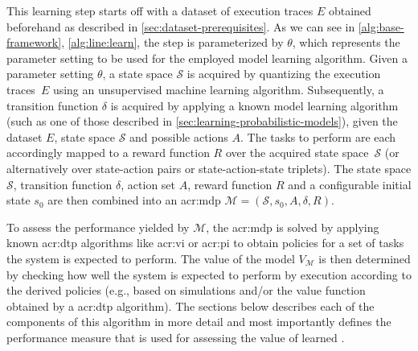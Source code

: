 This learning step starts off with a dataset of execution traces $E$ obtained beforehand as described in \autoref{sec:dataset-prerequisites}.
As we can see in \autoref{alg:base-framework}, \autoref{alg:line:learn}, the step is parameterized by $\theta$, which represents the parameter setting to be used for the employed model learning algorithm.
Given a parameter setting $\theta$, a state space $\mathcal{S}$ is acquired by quantizing the execution traces~$E$ using an unsupervised machine learning algorithm.
Subsequently, a transition function $\delta$ is acquired by applying a known model learning algorithm (such as one of those described in \autoref{sec:learning-probabilistic-models}), given the dataset $E$, state space $\mathcal{S}$ and possible actions $A$.
The tasks to perform are each accordingly mapped to a reward function $R$ over the acquired state space~$\mathcal{S}$ (or alternatively over state-action pairs or state-action-state triplets).
The state space $\mathcal{S}$, transition function $\delta$, action set $A$, reward function $R$ and a configurable initial state $s_0$ are then combined into an \acrshort{acr:mdp} $\mathcal{M} = (\mathcal{S}, s_0, A, \delta, R)$.

To assess the performance yielded by $\mathcal{M}$, the \acrshort{acr:mdp} is solved by applying known \acrshort{acr:dtp} algorithms like \acrshort{acr:vi} or \acrshort{acr:pi} to obtain policies for a set of tasks the system is expected to perform.
The value of the model $V_{\mathcal{M}}$ is then determined by checking how well the system is expected to perform by execution according to the derived policies (e.g., based on simulations and/or the value function obtained by a \acrshort{acr:dtp} algorithm).
The sections below describes each of the components of this algorithm in more detail and most importantly defines the performance measure that is used for assessing the value of learned .



